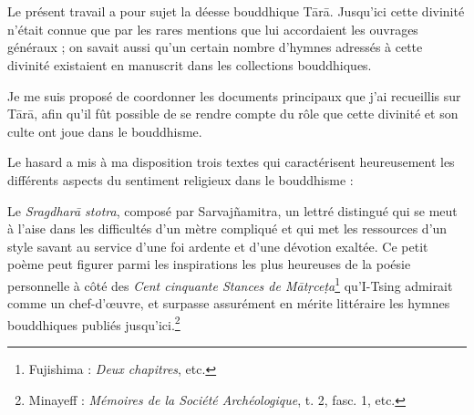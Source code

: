 \documentclass[a4paper, 11pt, oneside, french]{article}
\begin{document}
\setlength{\parskip}{1mm plus1mm minus1mm}
\clearpage
\footnotesize
\tableofcontents
\clearpage
\section*{}
\paragraph{}
Le présent travail a pour sujet la déesse bouddhique T\={a}r\={a}. Jusqu'ici cette divinité n'était connue que par les rares mentions que lui accordaient les ouvrages généraux ; on savait aussi qu'un certain nombre d'hymnes adressés à cette divinité existaient en manuscrit dans les collections bouddhiques.

Je me suis proposé de coordonner les documents principaux que j'ai recueillis sur T\={a}r\={a}, afin qu'il fût possible de se rendre compte du rôle que cette divinité et son culte ont joue dans le bouddhisme.

Le hasard a mis à ma disposition trois textes qui caractérisent heureusement les différents aspects du sentiment religieux dans le bouddhisme :

Le \emph{Sragdhar\={a} stotra}, composé par Sarvaj\~{n}amitra, un lettré distingué qui se meut à l'aise dans les difficultés d'un mètre compliqué et qui met les ressources d'un style savant au service d'une foi ardente et d'une dévotion exaltée. Ce petit poème peut figurer parmi les inspirations les plus heureuses de la poésie personnelle à côté des \emph{Cent cinquante Stances de M\={a}t\d{r}ce\d{t}a}\footnote{Fujishima : \emph{Deux chapitres}, etc.} qu'I-Tsing admirait comme un chef-d'œuvre, et surpasse assurément en mérite littéraire les hymnes bouddhiques publiés jusqu'ici.\footnote{Minayeff : \emph{Mémoires de la Société Archéologique}, t. 2, fasc. 1, etc.}
\end{document}
